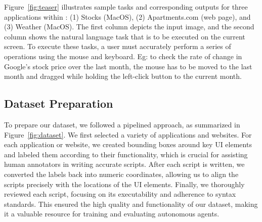 Figure~\ref{fig:teaser} illustrates sample tasks and corresponding outputs for three applications within \ModelName: (1) Stocks (MacOS), (2) Apartments.com (web page), and (3) Weather (MacOS). The first column depicts the input image, and the second column shows the natural language task that is to be executed on the current screen. To execute these tasks, a user must accurately perform a series of operations using the mouse and keyboard. Eg: to check the rate of change in Google's stock price over the last month, the mouse has to be moved to the last month and dragged while holding the left-click button to the current month.

\subsection{Dataset Preparation}
To prepare our dataset, we followed a pipelined approach, as summarized in Figure~\ref{fig:dataset}. We first selected a variety of applications and websites. For each application or website, we created bounding boxes around key UI elements and labeled them according to their functionality, which is crucial for assisting human annotators in writing accurate \textit{\pyautogui} scripts. After each script is written, we converted the labels back into numeric coordinates, allowing us to align the scripts precisely with the locations of the UI elements. Finally, we thoroughly reviewed each script, focusing on its executability and adherence to syntax standards. This ensured the high quality and functionality of our dataset, making it a valuable resource for training and evaluating autonomous agents.

